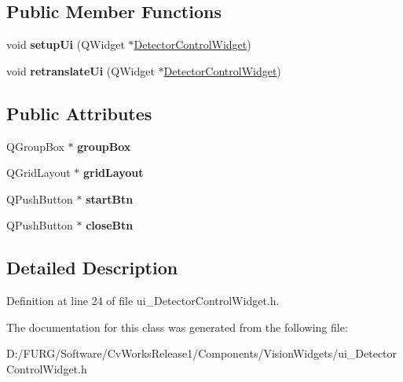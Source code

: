 \subsection*{Public Member Functions}
\begin{DoxyCompactItemize}
\item 
\hypertarget{class_ui___detector_control_widget_ad6ad0255f9f84e2a0f046dff642484da}{}void {\bfseries setup\+Ui} (Q\+Widget $\ast$\hyperlink{class_detector_control_widget}{Detector\+Control\+Widget})\label{class_ui___detector_control_widget_ad6ad0255f9f84e2a0f046dff642484da}

\item 
\hypertarget{class_ui___detector_control_widget_ab23b85392ca6ab76253016a1cd936f21}{}void {\bfseries retranslate\+Ui} (Q\+Widget $\ast$\hyperlink{class_detector_control_widget}{Detector\+Control\+Widget})\label{class_ui___detector_control_widget_ab23b85392ca6ab76253016a1cd936f21}

\end{DoxyCompactItemize}
\subsection*{Public Attributes}
\begin{DoxyCompactItemize}
\item 
\hypertarget{class_ui___detector_control_widget_abdf6ae306987e2427f22eea513893d44}{}Q\+Group\+Box $\ast$ {\bfseries group\+Box}\label{class_ui___detector_control_widget_abdf6ae306987e2427f22eea513893d44}

\item 
\hypertarget{class_ui___detector_control_widget_ac1dae5cc62a10f373d1bba5e661250e2}{}Q\+Grid\+Layout $\ast$ {\bfseries grid\+Layout}\label{class_ui___detector_control_widget_ac1dae5cc62a10f373d1bba5e661250e2}

\item 
\hypertarget{class_ui___detector_control_widget_a701098e9acd54f38e28ad936f22fd06e}{}Q\+Push\+Button $\ast$ {\bfseries start\+Btn}\label{class_ui___detector_control_widget_a701098e9acd54f38e28ad936f22fd06e}

\item 
\hypertarget{class_ui___detector_control_widget_a8ac35828c01d1144abfd6b4640c347b6}{}Q\+Push\+Button $\ast$ {\bfseries close\+Btn}\label{class_ui___detector_control_widget_a8ac35828c01d1144abfd6b4640c347b6}

\end{DoxyCompactItemize}


\subsection{Detailed Description}


Definition at line 24 of file ui\+\_\+\+Detector\+Control\+Widget.\+h.



The documentation for this class was generated from the following file\+:\begin{DoxyCompactItemize}
\item 
D\+:/\+F\+U\+R\+G/\+Software/\+Cv\+Works\+Release1/\+Components/\+Vision\+Widgets/ui\+\_\+\+Detector\+Control\+Widget.\+h\end{DoxyCompactItemize}
